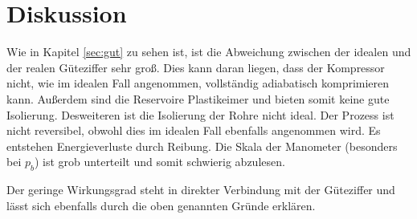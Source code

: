 \section{Diskussion}

Wie in Kapitel \ref{sec:gut} zu sehen ist, ist die Abweichung zwischen der idealen und der realen
Güteziffer sehr groß. Dies kann daran liegen, dass
der Kompressor nicht, wie im idealen Fall angenommen, vollständig adiabatisch komprimieren kann.
Außerdem sind die Reservoire Plastikeimer und bieten somit keine gute Isolierung.
Desweiteren ist die Isolierung der Rohre nicht ideal.
Der Prozess ist nicht reversibel, obwohl dies im idealen Fall ebenfalls angenommen wird.
Es entstehen Energieverluste durch Reibung.
Die Skala der Manometer (besonders bei $p_b$) ist grob unterteilt und somit schwierig abzulesen.

Der geringe Wirkungsgrad steht in direkter Verbindung mit der Güteziffer und
lässt sich ebenfalls durch die oben genannten Gründe erklären.
